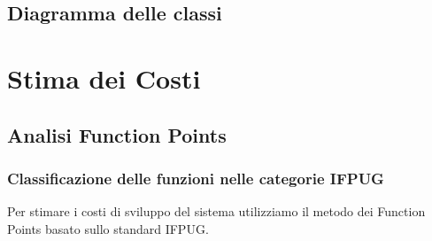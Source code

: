 \documentclass[12pt, a4paper]{article}
\begin{document}
\subsection{Diagramma delle classi}

\section{Stima dei Costi}
\subsection{Analisi Function Points}
\subsubsection{Classificazione delle funzioni nelle categorie IFPUG}
Per stimare i costi di sviluppo del sistema utilizziamo il metodo dei Function Points basato sullo standard IFPUG.
\end{document}
